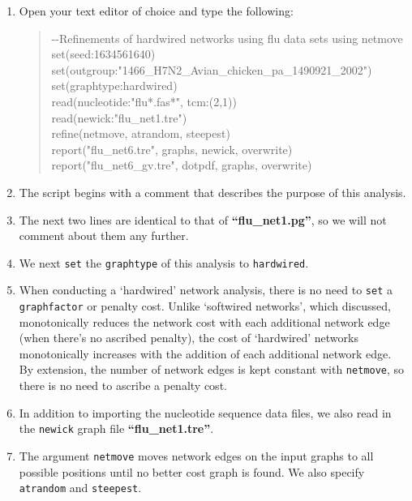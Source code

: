 \documentclass[11pt]{article}
\begin{document}
\begin {enumerate}

\item Open your text editor of choice and type the following:

	\begin{quote}	
	-\/-Refinements of hardwired networks using flu data sets using netmove\\
	set(seed:1634561640)\\
	set(outgroup:"1466\_H7N2\_Avian\_chicken\_pa\_1490921\_2002")\\
	set(graphtype:hardwired)\\
	read(nucleotide:"flu*.fas*", tcm:(2,1))\\
	read(newick:"flu\_net1.tre")\\
	refine(netmove, atrandom, steepest)\\
	report("flu\_net6.tre", graphs, newick, overwrite)\\
	report("flu\_net6\_gv.tre", dotpdf, graphs, overwrite)
	\end{quote}
	
\item The script begins with a comment that describes the purpose of this 
analysis.

\item The next two lines are identical to that of \textbf{``flu\_net1.pg''}, so we 
will not comment about them any further. 	

\item We next \texttt{set} the \texttt{graphtype} of this analysis to \texttt{hardwired}. 

\item When conducting a `hardwired' network analysis, there is no need to \texttt{set}
a \texttt{graphfactor} or penalty cost. Unlike `softwired networks', which discussed, 
monotonically reduces the network cost with each additional network edge (when 
there's no ascribed penalty), 
the cost of `hardwired' networks monotonically increases with the addition of each 
additional network edge. By extension, the number of network edges is kept constant
with \texttt{netmove}, so there is no need to ascribe a penalty cost.

\item In addition to importing the nucleotide sequence data files, we also read in 
the \texttt{newick} graph file \textbf{``flu\_net1.tre''}.

\item The argument \texttt{netmove} moves network edges on the input graphs 
to all possible positions until no better cost graph is found. We also specify 
\texttt{atrandom} and \texttt{steepest}.


\end{enumerate}
\end{document}
